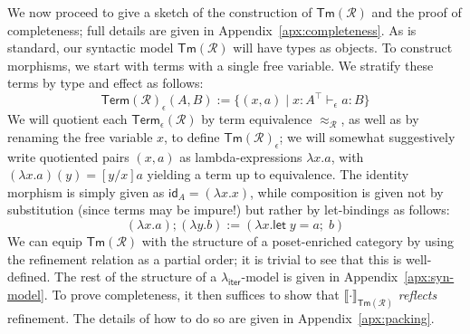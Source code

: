 \documentclass[acmsmall,screen,review]{acmart}
\newcommand{\mc}[1]{\ensuremath{\mathcal{#1}}}
\newcommand{\ms}[1]{\ensuremath{\mathsf{#1}}}
\newcommand{\letexpr}[3]{\ensuremath{\ms{let}\;#1 = #2;\;#3}}
\newcommand{\hasty}[4]{#1 \vdash_{#2} #3: {#4}}
\newcommand{\dnt}[1]{\llbracket{#1}\rrbracket}
\newcommand{\subiterexp}{\texorpdfstring{\(\lambda_{\ms{iter}}\)}{lambda-iter}}
\begin{document}
We now proceed to give a sketch of the construction of $\ms{Tm}(\mc{R})$ and the proof of 
completeness; full details are given in Appendix~\ref{apx:completeness}. As is standard, our 
syntactic model $\ms{Tm}(\mc{R})$ will have types as objects. 
To construct morphisms, we start with terms with a single free variable. We stratify these terms by
type and effect as follows:
$$
\ms{Term}(\mc{R})_\epsilon(A, B) := \{(x, a) \mid \hasty{x : A^\top}{\epsilon}{a}{B}\}
$$
We will quotient each $\ms{Term}_\epsilon(\mc{R})$ by term equivalence $\approx_{\mc{R}}$, as well
as by renaming the free variable $x$, to define $\ms{Tm}(\mc{R})_\epsilon$; we will somewhat
suggestively write quotiented pairs $(x, a)$ as lambda-expressions $\lambda x. a$, with $(\lambda x
. a)(y) = [y/x]a$ yielding a term up to equivalence. The identity morphism is simply given as
$\ms{id}_A = (\lambda x. x)$, while composition is given not by substitution (since terms may be
impure!) but rather by let-bindings as follows:
$$
(\lambda x . a) ; (\lambda y . b) := (\lambda x . \letexpr{y}{a}{b})
$$
We can equip $\ms{Tm}(\mc{R})$ with the structure of a poset-enriched category by using the
refinement relation as a partial order; it is trivial to see that this is well-defined. The rest of
the structure of a \subiterexp{}-model is given in Appendix~\ref{apx:syn-model}. To prove
completeness, it then suffices to show that $\dnt{\cdot}_{\ms{Tm}(\mc{R})}$ \emph{reflects}
refinement. The details of how to do so are given in Appendix~\ref{apx:packing}.
\end{document}
